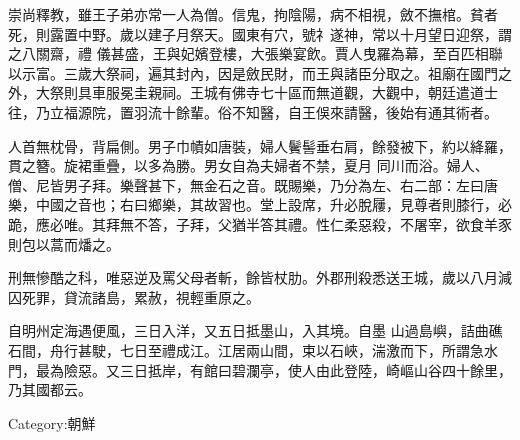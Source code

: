 \begin{pinyinscope}
 崇尚釋教，雖王子弟亦常一人為僧。信鬼，拘陰陽，病不相視，斂不撫棺。貧者死，則露置中野。歲以建子月祭天。國東有穴，號礻遂神，常以十月望日迎祭，謂之八關齋，禮
 儀甚盛，王與妃嬪登樓，大張樂宴飲。賈人曳羅為幕，至百匹相聯以示富。三歲大祭祠，遍其封內，因是斂民財，而王與諸臣分取之。祖廟在國門之外，大祭則具車服冕圭親祠。王城有佛寺七十區而無道觀，大觀中，朝廷遣道士往，乃立福源院，置羽流十餘輩。俗不知醫，自王俁來請醫，後始有通其術者。



 人首無枕骨，背扁側。男子巾幘如唐裝，婦人鬢髻垂右肩，餘發被下，約以絳羅，貫之簪。旋裙重疊，以多為勝。男女自為夫婦者不禁，夏月
 同川而浴。婦人、僧、尼皆男子拜。樂聲甚下，無金石之音。既賜樂，乃分為左、右二部：左曰唐樂，中國之音也；右曰鄉樂，其故習也。堂上設席，升必脫屨，見尊者則膝行，必跪，應必唯。其拜無不答，子拜，父猶半答其禮。性仁柔惡殺，不屠宰，欲食羊豕則包以蒿而燔之。



 刑無慘酷之科，唯惡逆及罵父母者斬，餘皆杖肋。外郡刑殺悉送王城，歲以八月減囚死罪，貸流諸島，累赦，視輕重原之。



 自明州定海遇便風，三日入洋，又五日抵墨山，入其境。自墨
 山過島嶼，詰曲礁石間，舟行甚駛，七日至禮成江。江居兩山間，束以石峽，湍激而下，所謂急水門，最為險惡。又三日抵岸，有館曰碧瀾亭，使人由此登陸，崎嶇山谷四十餘里，乃其國都云。



 Category:朝鮮



\end{pinyinscope}